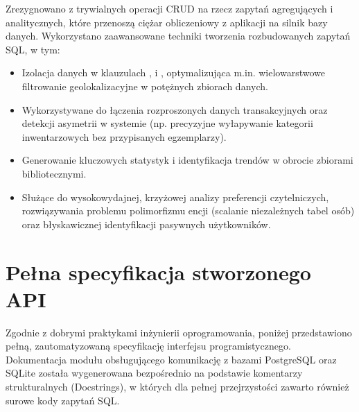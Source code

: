 \documentclass[a4paper,11pt,english,openany,oneside]{sphinxmanual}
\begin{document}
\sphinxAtStartPar
Zrezygnowano z trywialnych operacji CRUD na rzecz zapytań agregujących i analitycznych, które przenoszą ciężar obliczeniowy z aplikacji na silnik bazy danych. Wykorzystano zaawansowane techniki tworzenia rozbudowanych zapytań SQL, w tym:
\begin{itemize}
\item {} 
\sphinxAtStartPar
{} Izolacja danych w klauzulach ,  i , optymalizująca m.in. wielowarstwowe filtrowanie geolokalizacyjne w potężnych zbiorach danych.

\item {} 
\sphinxAtStartPar
{} Wykorzystywane do łączenia rozproszonych danych transakcyjnych oraz detekcji asymetrii w systemie (np. precyzyjne wyłapywanie kategorii inwentarzowych bez przypisanych egzemplarzy).

\item {} 
\sphinxAtStartPar
{} Generowanie kluczowych statystyk i identyfikacja trendów w obrocie zbiorami bibliotecznymi.

\item {} 
\sphinxAtStartPar
{} Służące do wysokowydajnej, krzyżowej analizy preferencji czytelniczych, rozwiązywania problemu polimorfizmu encji (scalanie niezależnych tabel osób) oraz błyskawicznej identyfikacji pasywnych użytkowników.

\end{itemize}


\section{Pełna specyfikacja stworzonego API}
\label{\detokenize{rozdzial_5/index:pelna-specyfikacja-stworzonego-api}}
\sphinxAtStartPar
Zgodnie z dobrymi praktykami inżynierii oprogramowania, poniżej przedstawiono pełną, zautomatyzowaną specyfikację interfejsu programistycznego. Dokumentacja modułu obsługującego komunikację z bazami PostgreSQL oraz SQLite została wygenerowana bezpośrednio na podstawie komentarzy strukturalnych (Docstrings), w których dla pełnej przejrzystości zawarto również surowe kody zapytań SQL.
\end{document}
